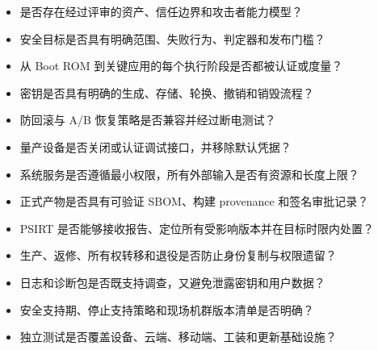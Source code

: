 \begin{itemize}
  \item 是否存在经过评审的资产、信任边界和攻击者能力模型？
  \item 安全目标是否具有明确范围、失败行为、判定器和发布门槛？
  \item 从 Boot ROM 到关键应用的每个执行阶段是否都被认证或度量？
  \item 密钥是否具有明确的生成、存储、轮换、撤销和销毁流程？
  \item 防回滚与 A/B 恢复策略是否兼容并经过断电测试？
  \item 量产设备是否关闭或认证调试接口，并移除默认凭据？
  \item 系统服务是否遵循最小权限，所有外部输入是否有资源和长度上限？
  \item 正式产物是否具有可验证 SBOM、构建 provenance 和签名审批记录？
  \item PSIRT 是否能够接收报告、定位所有受影响版本并在目标时限内处置？
  \item 生产、返修、所有权转移和退役是否防止身份复制与权限遗留？
  \item 日志和诊断包是否既支持调查，又避免泄露密钥和用户数据？
  \item 安全支持期、停止支持策略和现场机群版本清单是否明确？
  \item 独立测试是否覆盖设备、云端、移动端、工装和更新基础设施？
\end{itemize}
